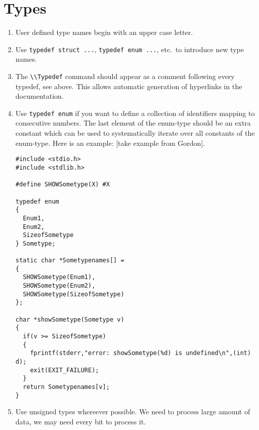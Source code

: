 \documentclass[12pt]{article}
\begin{document}
\section{Types}
\begin{enumerate} 
\item
User defined type names begin with an upper case letter.
\item
Use \texttt{typedef struct ...}, 
\texttt{typedef enum ...}, etc.\ to introduce
new type names.
\item
The \verb"\\Typedef" command should appear as a comment following every
typedef, see above. This allows automatic generation of hyperlinks
in the documentation.
\item
Use \texttt{typedef enum} if you want to define a collection of identifiers
mapping to consecutive numbers. The last element of the enum-type should
be an extra constant which can be used to systematically iterate over
all constants of the enum-type. Here is an example: [take example
from Gordon].

\begin{verbatim}
#include <stdio.h>
#include <stdlib.h>

#define SHOWSometype(X) #X

typedef enum
{
  Enum1,
  Enum2,
  SizeofSometype
} Sometype;

static char *Sometypenames[] = 
{
  SHOWSometype(Enum1),
  SHOWSometype(Enum2),
  SHOWSometype(SizeofSometype)
};

char *showSometype(Sometype v)
{
  if(v >= SizeofSometype)
  {
    fprintf(stderr,"error: showSometype(%d) is undefined\n",(int) d);
    exit(EXIT_FAILURE);
  }
  return Sometypenames[v];
}
\end{verbatim}

\item
Use unsigned types whereever possible. We need to process large amount
of data, we may need every bit to process it.
\end{enumerate}
\end{document}
